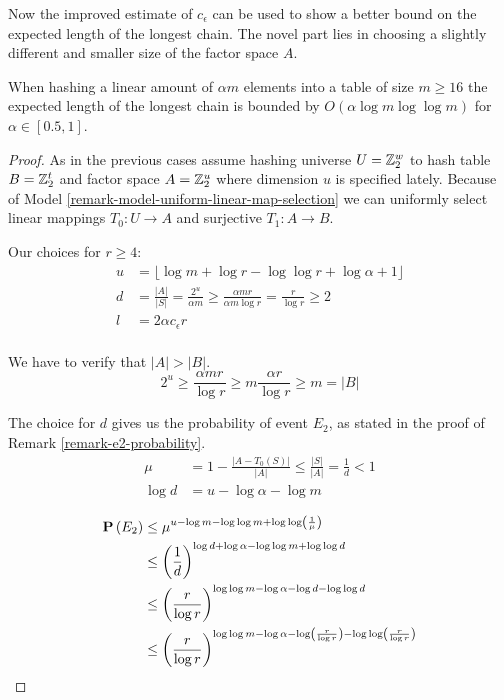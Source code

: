 Now the improved estimate of $c_\epsilon$ can be used to show a better bound on the expected length of the longest chain. The novel part lies in choosing a slightly different and smaller size of the factor space $A$.
\begin{theorem}
\label{theorem-hashing-linear-amount}
When hashing a linear amount of $\alpha m$ elements into a table of size $m \geq 16$ the expected length of the longest chain is bounded by $O(\alpha \log m \log \log m)$ for $\alpha \in \left[0.5, 1 \right]$.
\end{theorem}
\begin{proof}
As in the previous cases assume hashing universe $U = \mathbb{Z}_{2}^{w}$ to hash table $B = \mathbb{Z}_{2}^{t}$ and factor space $A = \mathbb{Z}_{2}^{u}$ where dimension $u$ is specified lately. Because of Model \ref{remark-model-uniform-linear-map-selection} we can uniformly select linear mappings $T_0: U \rightarrow A$ and surjective $T_1: A \rightarrow B$.

Our choices for $r \geq 4$:
\[
\begin{split}
u & = \lfloor \log m + \log r - \log \log r + \log \alpha + 1\rfloor \\
d & = \frac{|A|}{|S|} = \frac{2 ^ u}{\alpha m} \geq \frac{\alpha m r}{\alpha m \log r} = \frac{r}{\log r} \geq 2 \\
l & = 2 \alpha c_\epsilon r \\
\end{split}
\]

We have to verify that $|A| > |B|$.
\[
2 ^ u \geq \frac{\alpha m r }{\log r} \geq m \frac{\alpha r}{\log r} \geq m = |B|
\]

The choice for $d$ gives us the probability of event $E_2$, as stated in the proof of Remark \ref{remark-e2-probability}.
\[
\begin{split}
\mu & = 1 - \frac{|A - T_0(S)|}{|A|} \leq \frac{|S|}{|A|} = \frac{1}{d} < 1 \\
\log d & = u - \log \alpha - \log m
\end{split}
\]

\[
\begin{split}
\mathbf{P}\left(E_2\right)
	& \leq \mu ^ {u - \log m - \log \log m + \log \log \left( \frac{1}{\mu} \right)} \\
	& \leq \left(\frac{1}{d}\right) ^ {\log d + \log \alpha - \log \log m + \log \log d} \\
	& \leq \left(\frac{r}{\log r}\right) ^ {\log \log m - \log \alpha - \log d - \log \log d} \\
	& \leq \left(\frac{r}{\log r}\right) ^ {\log \log m - \log \alpha - \log \left(\frac{r}{\log r}\right) - \log \log \left(\frac{r}{\log r}\right)} \\
\end{split}
\]


\end{proof}
